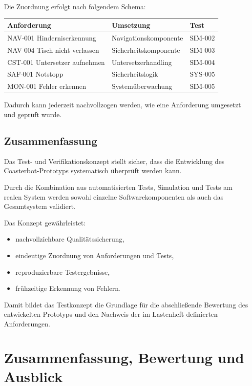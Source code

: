 \documentclass[
  a4paper,
  12pt,
  DIV=12,        %
  parskip=half,  %
  headings=small %
]{scrartcl}
\theoremstyle{definition}
\providecommand{\tightlist}{%
  \setlength{\itemsep}{0pt}\setlength{\parskip}{0pt}}
\theoremstyle{definition}
\begin{document}
Die Zuordnung erfolgt nach folgendem Schema:

\begin{longtable}[]{@{}lll@{}}
\toprule\noalign{}
Anforderung & Umsetzung & Test \\
\midrule\noalign{}
\endhead
\bottomrule\noalign{}
\endlastfoot
NAV-001 Hinderniserkennung & Navigationskomponente & SIM-002 \\
NAV-004 Tisch nicht verlassen & Sicherheitskomponente & SIM-003 \\
CST-001 Untersetzer aufnehmen & Untersetzerhandling & SIM-004 \\
SAF-001 Notstopp & Sicherheitslogik & SYS-005 \\
MON-001 Fehler erkennen & Systemüberwachung & SIM-005 \\
\end{longtable}

Dadurch kann jederzeit nachvollzogen werden, wie eine Anforderung
umgesetzt und geprüft wurde.

\subsection{Zusammenfassung}\label{zusammenfassung-5}

Das Test- und Verifikationskonzept stellt sicher, dass die Entwicklung
des Coasterbot-Prototyps systematisch überprüft werden kann.

Durch die Kombination aus automatisierten Tests, Simulation und Tests am
realen System werden sowohl einzelne Softwarekomponenten als auch das
Gesamtsystem validiert.

Das Konzept gewährleistet:

\begin{itemize}
\tightlist
\item
  nachvollziehbare Qualitätssicherung,
\item
  eindeutige Zuordnung von Anforderungen und Tests,
\item
  reproduzierbare Testergebnisse,
\item
  frühzeitige Erkennung von Fehlern.
\end{itemize}

Damit bildet das Testkonzept die Grundlage für die abschließende
Bewertung des entwickelten Prototyps und den Nachweis der im Lastenheft
definierten Anforderungen.

\section{Zusammenfassung, Bewertung und
Ausblick}\label{zusammenfassung-bewertung-und-ausblick}
\end{document}
